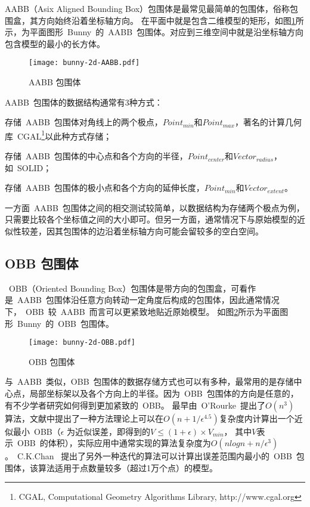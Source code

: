 AABB（Asix Aligned Bounding
Box）包围体是最常见最简单的包围体，俗称包围盒，其方向始终沿着坐标轴方向\cite{bergen1997efficient}。
在平面中就是包含二维模型的矩形，如图\ref{fig:aabb-bunny}所示，为平面图形~Bunny~的~AABB~包围体。对应到三维空间中就是沿坐标轴方向包含模型的最小的长方体。

\begin{figure}[H] %
  \centering
  \texttt{[image: bunny-2d-AABB.pdf]}
  \caption{AABB 包围体}
  \label{fig:aabb-bunny}
\end{figure}

AABB~包围体的数据结构通常有3种方式：
\begin{inparaenum}[(1)]
\item 存储~AABB~包围体对角线上的两个极点，$Point_{min}$和$Point_{max}$，著名的计算几何库~CGAL\footnote{CGAL, Computational Geometry Algorithms Library, http://www.cgal.org}以此种方式存储；
\item 存储~AABB~包围体的中心点和各个方向的半径，$Point_{center}$和$Vector_{radius}$，如~SOLID\cite{bergen1997efficient}；
\item 存储~AABB~包围体的极小点和各个方向的延伸长度\cite{ericson2005real}，$Point_{min}$和$Vector_{extent}$。
\end{inparaenum} 

一方面~AABB~包围体之间的相交测试较简单，以数据结构为存储两个极点为例，只需要比较各个坐标值之间的大小即可。但另一方面，通常情况下与原始模型的近似性较差，因其包围体的边沿着坐标轴方向可能会留较多的空白空间。

\subsection{OBB 包围体}

~OBB（Oriented Bounding
Box）包围体是带方向的包围盒，可看作是~AABB~包围体沿任意方向转动一定角度后构成的包围体，因此通常情况下，~OBB~较~AABB~而言可以更紧致地贴近原始模型。
如图\ref{fig:obb-bunny}所示为平面图形~Bunny~的~OBB~包围体。

\begin{figure}[H] %
  \centering
  \texttt{[image: bunny-2d-OBB.pdf]}
  \caption{OBB 包围体}
  \label{fig:obb-bunny}
\end{figure}

与~AABB~类似，OBB~包围体的数据存储方式也可以有多种，最常用的是存储中心点，局部坐标架以及各个方向上的半径\cite{gottschalk1996obbtree}。因为~OBB~包围体的方向是任意的，有不少学者研究如何得到更加紧致的~OBB。
最早由~O'Rourke~\cite{o1985finding}提出了$O(n^3)$
算法，文献中提出了一种方法理论上可以在$O(n
+ 1/ \epsilon ^{4.5} )$复杂度内计算出一个近似最小~OBB（$\epsilon$
为近似误差，即得到的$V\leq(1+\epsilon)\times V_{min}$，
其中$V$表示~OBB~的体积），实际应用中通常实现的算法复杂度为$O(nlogn + n/
\epsilon ^{3} )$。~C.K.Chan~ \cite{chan2001determination}
提出了另外一种迭代的算法可以计算出误差范围内最小的~OBB~包围体，该算法适用于点数量较多（超过1万个点）的模型。

